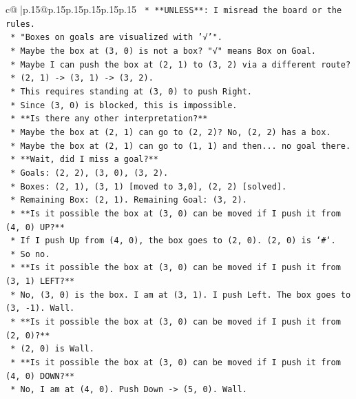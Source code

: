 \documentclass{article}
\begin{document}
{\begin{supertabular}{c@{$\;$}|p{.15\linewidth}@{}p{.15\linewidth}p{.15\linewidth}p{.15\linewidth}p{.15\linewidth}p{.15\linewidth}}
{{{\texttt{        *   **UNLESS**: I misread the board or the rules.} \\
\texttt{        *   "Boxes on goals are visualized with '√'".} \\
\texttt{        *   Maybe the box at (3, 0) is not a box? "√" means Box on Goal.} \\
\texttt{        *   Maybe I can push the box at (2, 1) to (3, 2) via a different route?} \\
\texttt{        *   (2, 1) {-}> (3, 1) {-}> (3, 2).} \\
\texttt{        *   This requires standing at (3, 0) to push Right.} \\
\texttt{        *   Since (3, 0) is blocked, this is impossible.} \\
\texttt{        *   **Is there any other interpretation?**} \\
\texttt{        *   Maybe the box at (2, 1) can go to (2, 2)? No, (2, 2) has a box.} \\
\texttt{        *   Maybe the box at (2, 1) can go to (1, 1) and then... no goal there.} \\
\texttt{        *   **Wait, did I miss a goal?**} \\
\texttt{        *   Goals: (2, 2), (3, 0), (3, 2).} \\
\texttt{        *   Boxes: (2, 1), (3, 1) {[}moved to 3,0{]}, (2, 2) {[}solved{]}.} \\
\texttt{        *   Remaining Box: (2, 1). Remaining Goal: (3, 2).} \\
\texttt{        *   **Is it possible the box at (3, 0) can be moved if I push it from (4, 0) UP?**} \\
\texttt{        *   If I push Up from (4, 0), the box goes to (2, 0). (2, 0) is `\#`.} \\
\texttt{        *   So no.} \\
\texttt{        *   **Is it possible the box at (3, 0) can be moved if I push it from (3, 1) LEFT?**} \\
\texttt{        *   No, (3, 0) is the box. I am at (3, 1). I push Left. The box goes to (3, {-}1). Wall.} \\
\texttt{        *   **Is it possible the box at (3, 0) can be moved if I push it from (2, 0)?**} \\
\texttt{        *   (2, 0) is Wall.} \\
\texttt{        *   **Is it possible the box at (3, 0) can be moved if I push it from (4, 0) DOWN?**} \\
\texttt{        *   No, I am at (4, 0). Push Down {-}> (5, 0). Wall.} \\
}}}
\end{supertabular}}
\end{document}

